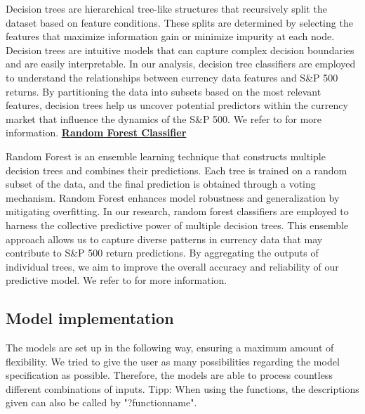 \noindent Decision trees are hierarchical tree-like structures that recursively split the dataset based on feature conditions. These splits are determined by selecting the features that maximize information gain or minimize impurity at each node. Decision trees are intuitive models that can capture complex decision boundaries and are easily interpretable. In our analysis, decision tree classifiers are employed to understand the relationships between currency data features and S&P 500 returns. By partitioning the data into subsets based on the most relevant features, decision trees help us uncover potential predictors within the currency market that influence the dynamics of the S&P 500. We refer to \cite{leobreiman} for more information.
\newline
\newline
\underline{\textbf{Random Forest Classifier}}

\noindent Random Forest is an ensemble learning technique that constructs multiple decision trees and combines their predictions. Each tree is trained on a random subset of the data, and the final prediction is obtained through a voting mechanism. Random Forest enhances model robustness and generalization by mitigating overfitting. In our research, random forest classifiers are employed to harness the collective predictive power of multiple decision trees. This ensemble approach allows us to capture diverse patterns in currency data that may contribute to S&P 500 return predictions. By aggregating the outputs of individual trees, we aim to improve the overall accuracy and reliability of our predictive model. We refer to \cite{tinkamho} for more information.

\subsection{Model implementation}
The models are set up in the following way, ensuring a maximum amount of flexibility. We tried to give the user as many possibilities regarding the model specification as possible. Therefore, the models are able to process countless different combinations of inputs. Tipp: When using the functions, the descriptions given can also be called by "?functionname".

